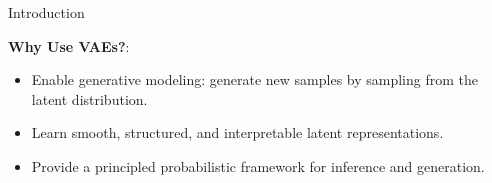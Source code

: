\begin{frame}[allowframebreaks]{Introduction}
\framebreak

\textbf{Why Use VAEs?}: 
\begin{itemize}
  \item Enable generative modeling: generate new samples by sampling from the latent distribution.
  \item Learn smooth, structured, and interpretable latent representations.
  \item Provide a principled probabilistic framework for inference and generation.
\end{itemize}

\end{frame}